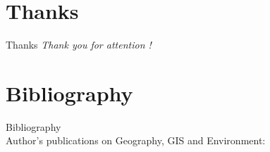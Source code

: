 \documentclass[pdflatex,compress,8pt,
	xcolor={dvipsnames,dvipsnames,svgnames,x11names,table},
	hyperref={	
	breaklinks = true, 
	pdfauthor={Lemenkova Polina}, 
	pdfsubject={Presentation}, 
	pdfcreator={Lemenkova Polina}, 
	pdfproducer={Lemenkova Polina}, 
	colorlinks=true,
	linkcolor=NavyBlue, 
	citecolor=NavyBlue, 
	urlcolor = NavyBlue, 
	breaklinks = true}]{beamer}
\begin{document}

\section{Thanks}
\begin{frame}{Thanks}
  	\centering \Large
	\emph{Thank you for attention !}\\
\end{frame}

\section{Bibliography}
\large{Bibliography}\\
\footnotesize{Author's publications on Geography, GIS and Environment:}
\nocite{*}
\printbibliography

\end{document}
